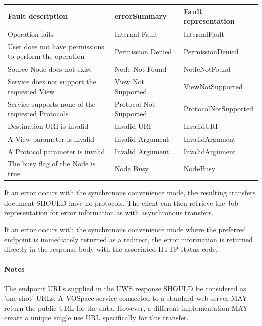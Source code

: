 \documentclass[11pt,a4paper]{ivoa}
\begin{document}
\vspace{3mm}
\begin{tabular}{ p{5cm} l p{4cm} }
\textbf{Fault description} & \textbf{errorSummary} & \textbf{Fault representation} \\
\hline
Operation fails & Internal Fault & InternalFault \\
\hline
User does not have permissions to perform the operation	 & Permission Denied & PermissionDenied \\
\hline
Source Node does not exist & Node Not Found & NodeNotFound \\
\hline
Service does not support the requested View & View Not Supported & ViewNotSupported \\
\hline
Service supports none of the requested Protocols & Protocol Not Supported &ProtocolNotSupported \\
\hline
Destination URI is invalid & Invalid URI & InvalidURI \\
\hline
A View parameter is invalid & Invalid Argument & InvalidArgument \\
\hline
A Protocol parameter is invalid & Invalid Argument & InvalidArgument \\
\hline
The busy flag of the Node is true & Node Busy & NodeBusy \\
\hline
\end{tabular}
\vspace{3mm}

If an error occurs with the synchronous convenience mode, the resulting transfers document SHOULD have no protocols. The client can then retrieve the Job representation for error information as with asynchronous transfers.

If an error occurs with the synchronous convenience mode where the preferred endpoint is immediately returned as a redirect, the error information is returned directly in the response body with the associated HTTP status code.

\paragraph{Notes}
The endpoint URLs supplied in the UWS response SHOULD be considered as 'one shot' URLs. A VOSpace service connected to a standard web server MAY return the public URL for the data. However, a different implementation MAY create a unique single use URL specifically for this transfer.
\end{document}
